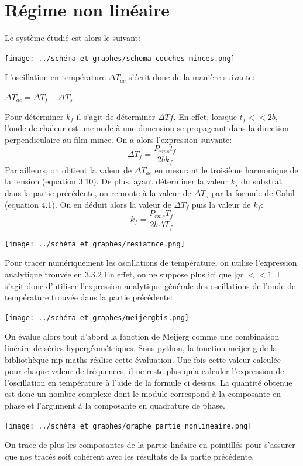 \documentclass[10pt,a4paper]{report}
\begin{document}
\section{Régime non linéaire}
Le système étudié est alors le suivant:
\begin{center}
\texttt{[image: ../schéma et graphes/schema couches minces.png]}
\end{center}
L'oscillation en température $\Delta T_{ac}$ s'écrit donc de la manière suivante:
\begin{center}
$\Delta T_{ac}=\Delta T_{f}+\Delta T_{s}$
\end{center}
Pour déterminer $k_{f}$ il s'agit de déterminer $\Delta T{f}$. En effet, lorsque $t_{f}<<2b$, l'onde de chaleur est une onde à une dimension se propageant dans la direction perpendiculaire au film mince. On a alors l'expression suivante:
\begin{equation}
\Delta T_{f}=\frac{P_{rms}t_{f}}{2bk_{f}}
\end{equation}
Par ailleurs, on obtient la valeur de $\Delta T_{ac}$ en mesurant le troisième harmonique de la tension (equation 3.10).
De plus, ayant déterminer la valeur $k_{s}$ du substrat dans la partie précédente, on remonte à la valeur de $\Delta T_{s}$ par la formule de Cahil (equation 4.1). On en déduit alors la valeur de $\Delta T_{f}$ puis la valeur de $k_{f}$:
\begin{equation}
k_{f}=\frac{P_{rms}T_{f}}{2b\Delta T_{f}}
\end{equation}
\begin{center}
\texttt{[image: ../schéma et graphes/resiatnce.png]}
\end{center}
Pour tracer numériquement les oscillations de température, on utilise l'expression analytique trouvée en 3.3.2
En effet, on ne suppose plus ici que $\lvert qr\rvert<<1$. Il s'agit donc d'utiliser l'expression analytique générale des oscillations de l'onde de température trouvée dans la partie précédente:
\begin{center}
\texttt{[image: ../schéma et graphes/meijergbis.png]}
\end{center}
On évalue alors tout d'abord la fonction de Meijerg comme une combinaison linéaire de séries hypergéométriques. Sous python, la fonction meijer g de la bibliothèque mp maths réalise cette évaluation. Une fois cette valeur calculée pour chaque valeur de fréquences, il ne reste plus qu'a calculer l'expression de l'oscillation en température à l'aide de la formule ci dessus. La quantité obtenue est donc un nombre complexe dont le module correspond à la composante en phase et l'argument à la composante en quadrature de phase.
\begin{center}
\texttt{[image: ../schéma et graphes/graphe\_partie\_nonlineaire.png]}
\end{center}
On trace de plus les composantes de la partie linéaire en pointillés pour s'assurer que nos tracés soit cohérent avec les résultats de la partie précédente.
\end{document}
